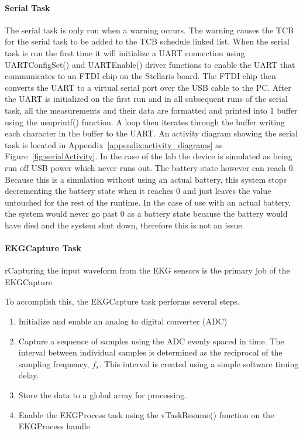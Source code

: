 \documentclass[12pt]{article} %
\begin{document}
    \paragraph{Serial Task} The serial task is only run when a warning occurs.
    The warning causes the TCB for the serial task to be added to the TCB
    schedule linked list. When the serial task is run the first time it will
    initialize a UART connection using UARTConfigSet() and UARTEnable() driver
    functions to enable the UART that communicates to an FTDI chip on the
    Stellaris board. The FTDI chip then converts the UART to a virtual serial
    port over the USB cable to the PC. After the UART is initialized on the
    first run and in all subsequent runs of the serial task, all the
    measurements and their data are formatted and printed into 1 buffer using
    the usnprintf() function. A loop then iterates through the buffer writing
    each character in the buffer to the UART. An activity diagram showing the
serial task is located in Appendix~\ref{appendix:activity_diagrams} as Figure~\ref{fig:serialActivity}.
In the case of the lab the device is simulated as being run off USB power which never runs out. The battery state however can reach 0.
Because this is a simulation without using an actual battery, this system stops decrementing the battery state when it reaches 0 and just leaves the value untouched for the rest of the runtime.
In the case of use with an actual battery, the system would never go past 0 as a battery state because the battery would have died and the system shut down, therefore this is not an issue.

\paragraph{EKGCapture Task}  rCapturing the input waveform from the EKG sensors is the primary job of the EKGCapture.

To accomplish this, the EKGCapture task performs several steps.
\begin{enumerate}
	\item Initialize and enable an analog to digital converter (ADC)
	\item Capture a sequence of samples using the ADC evenly spaced in time. The interval between individual samples is determined as the reciprocal of the sampling frequency, $f_{s}$. This interval is created using a simple software timing delay.
	\item Store the data to a global array for processing.
	\item Enable the EKGProcess task using the vTaskResume() function on the EKGProcess handle
\end{enumerate}
\end{document}
